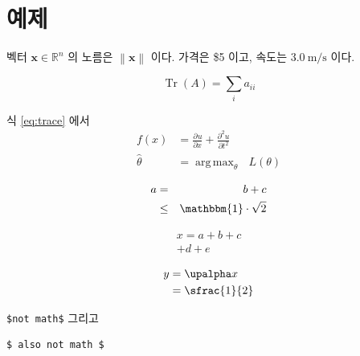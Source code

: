 \documentclass{article}
\newcommand{\R}{\mathbb{R}}
\newcommand{\norm}[1]{\left\lVert #1 \right\rVert}
\newcommand{\pd}[3][]{\frac{\partial^{#1} #2}{\partial #3^{#1}}}
\DeclareMathOperator{\Tr}{Tr}
\DeclareMathOperator*{\argmax}{arg\,max}
\def\vec#1{\bm{#1}}
\begin{document}
\section{예제}
벡터 $\vec{x} \in \R^n$ 의 노름은 \(\norm{\vec{x}}\) 이다. %
가격은 \$5 이고, 속도는 $\SI{3.0}{\meter\per\second}$ 이다.

\begin{equation}
  \Tr(A) = \sum_{i} a_{ii} \label{eq:trace}
\end{equation}

식 \eqref{eq:trace} 에서
\begin{align}
  f(x) &= \pd{u}{x} + \pd[2]{u}{t} \label{eq:a} \\
  \hat\theta &= \argmax_{\theta} \mbox{ } L(\theta) \nonumber
\end{align}

\begin{eqnarray*}
  a &=& b + c \\
    &\le& \mathbbm{1} \cdot \sqrt{2}
\end{eqnarray*}

\begin{multline}
  x = a + b + c \\
  + d + e \tag{M}
\end{multline}

\[ \begin{split} y &= \ensuremath{\upalpha} x \\ &= \sfrac{1}{2} \end{split} \]

\verb|$not math$| 그리고 \begin{verbatim}
$ also not math $
\end{verbatim}
\end{document}
